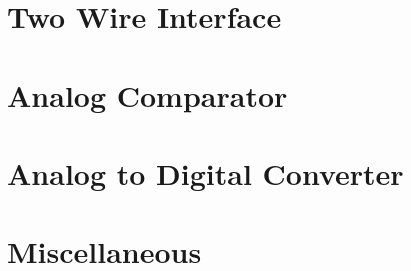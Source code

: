 \documentclass[oneside]{book}
\begin{document}
\chapter{Two Wire Interface}


\chapter{Analog Comparator}


\chapter{Analog to Digital Converter}


\chapter{Miscellaneous}

\nocite{*}


\end{document}

